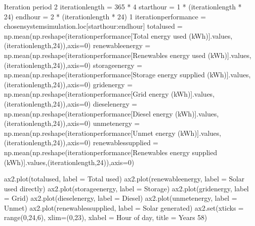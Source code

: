 \documentclass[letterpaper,10pt,english]{sphinxmanual}
\begin{document}
\begin{sphinxVerbatim}[commandchars=\\\{\}]
\PYGZsh{}Iteration period 2
iteration\PYGZus{}length = 365 * 4
start\PYGZus{}hour = 1 * (iteration\PYGZus{}length * 24)
end\PYGZus{}hour = 2 * (iteration\PYGZus{}length * 24) \PYGZhy{} 1
iteration\PYGZus{}performance = chosen\PYGZus{}system\PYGZus{}simulation.loc[start\PYGZus{}hour:end\PYGZus{}hour]
total\PYGZus{}used = np.mean(np.reshape(iteration\PYGZus{}performance[\PYGZsq{}Total energy used (kWh)\PYGZsq{}].values,(iteration\PYGZus{}length,24)),axis=0)
renewable\PYGZus{}energy = np.mean(np.reshape(iteration\PYGZus{}performance[\PYGZsq{}Renewables energy used (kWh)\PYGZsq{}].values,(iteration\PYGZus{}length,24)),axis=0)
storage\PYGZus{}energy = np.mean(np.reshape(iteration\PYGZus{}performance[\PYGZsq{}Storage energy supplied (kWh)\PYGZsq{}].values,(iteration\PYGZus{}length,24)),axis=0)
grid\PYGZus{}energy = np.mean(np.reshape(iteration\PYGZus{}performance[\PYGZsq{}Grid energy (kWh)\PYGZsq{}].values,(iteration\PYGZus{}length,24)),axis=0)
diesel\PYGZus{}energy = np.mean(np.reshape(iteration\PYGZus{}performance[\PYGZsq{}Diesel energy (kWh)\PYGZsq{}].values,(iteration\PYGZus{}length,24)),axis=0)
unmet\PYGZus{}energy = np.mean(np.reshape(iteration\PYGZus{}performance[\PYGZsq{}Unmet energy (kWh)\PYGZsq{}].values,(iteration\PYGZus{}length,24)),axis=0)
renewables\PYGZus{}supplied = np.mean(np.reshape(iteration\PYGZus{}performance[\PYGZsq{}Renewables energy supplied (kWh)\PYGZsq{}].values,(iteration\PYGZus{}length,24)),axis=0)

ax2.plot(total\PYGZus{}used, label = \PYGZsq{}Total used\PYGZsq{})
ax2.plot(renewable\PYGZus{}energy, label = \PYGZsq{}Solar used directly\PYGZsq{})
ax2.plot(storage\PYGZus{}energy, label = \PYGZsq{}Storage\PYGZsq{})
ax2.plot(grid\PYGZus{}energy, label = \PYGZsq{}Grid\PYGZsq{})
ax2.plot(diesel\PYGZus{}energy, label = \PYGZsq{}Diesel\PYGZsq{})
ax2.plot(unmet\PYGZus{}energy, label = \PYGZsq{}Unmet\PYGZsq{})
ax2.plot(renewables\PYGZus{}supplied, label = \PYGZsq{}Solar generated\PYGZsq{})
ax2.set(xticks = range(0,24,6),
        xlim=(0,23),
        xlabel = \PYGZsq{}Hour of day\PYGZsq{},
        title = \PYGZsq{}Years 5\PYGZhy{}8\PYGZsq{})


\end{sphinxVerbatim}
\end{document}
